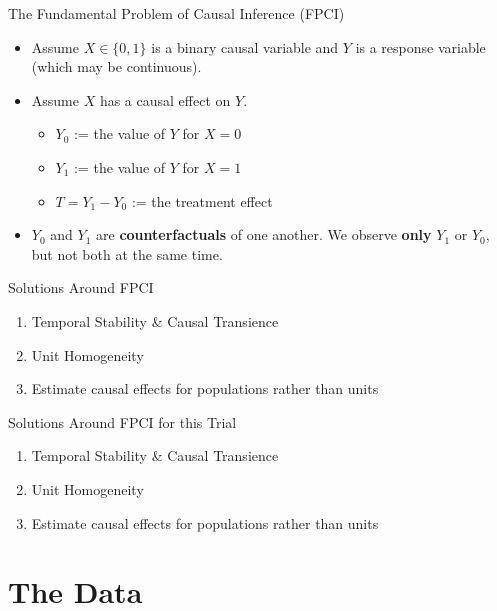 \documentclass{beamer}
\begin{document}
\begin{frame}{The Fundamental Problem of Causal Inference (FPCI)}
  \begin{itemize}
    \item<+-> Assume $X \in\{0,1\}$ is a binary causal variable and $Y$ is a response variable (which may be continuous).
    \item<+-> Assume $X$ has a causal effect on $Y$.
    \begin{itemize}
      \item $Y_0$ := the value of $Y$ for $X=0$ %
      \item $Y_1$ := the value of $Y$ for $X=1$ %
      \item $T = Y_1 - Y_0$ := the treatment effect
    \end{itemize}
    \item<+-> $Y_0$ and $Y_1$ are \textbf{counterfactuals} of one another. We observe \textbf{only} $Y_1$ or $Y_0$, but not both at the same time.
  \end{itemize}
\end{frame}

\begin{frame}{Solutions Around FPCI}
  \begin{enumerate}
    \item<+-> Temporal Stability \& Causal Transience
    \item<+-> Unit Homogeneity
    \item<+-> Estimate causal effects for populations rather than units 
  \end{enumerate}
\end{frame}

\begin{frame}{Solutions Around FPCI for this Trial}
  \begin{enumerate}
    \item Temporal Stability \& Causal Transience {\color{red}{X}}
    \item Unit Homogeneity {\color{red}{X}}
    \item Estimate causal effects for populations rather than units {\color{green}{\checkmark}}
  \end{enumerate}
\end{frame}

\section{The Data}
\end{document}
